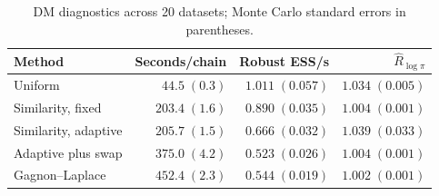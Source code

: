 \begin{table}[t]
\centering
\caption{DM diagnostics across 20 datasets; Monte Carlo standard errors in parentheses.}
\label{tab:DM_computation}
\fontsize{12}{9}\selectfont
\begin{tabular}{lrrr}
\toprule
Method & Seconds/chain & Robust ESS/s & $\widehat R_{\log\pi}$ \\
\midrule
Uniform & $44.5\;(0.3)$ & $1.011\;(0.057)$ & $1.034\;(0.005)$ \\
Similarity, fixed & $203.4\;(1.6)$ & $0.890\;(0.035)$ & $1.004\;(0.001)$ \\
Similarity, adaptive & $205.7\;(1.5)$ & $0.666\;(0.032)$ & $1.039\;(0.033)$ \\
Adaptive plus swap & $375.0\;(4.2)$ & $0.523\;(0.026)$ & $1.004\;(0.001)$ \\
Gagnon--Laplace & $452.4\;(2.3)$ & $0.544\;(0.019)$ & $1.002\;(0.001)$ \\
\bottomrule
\end{tabular}
\end{table}
